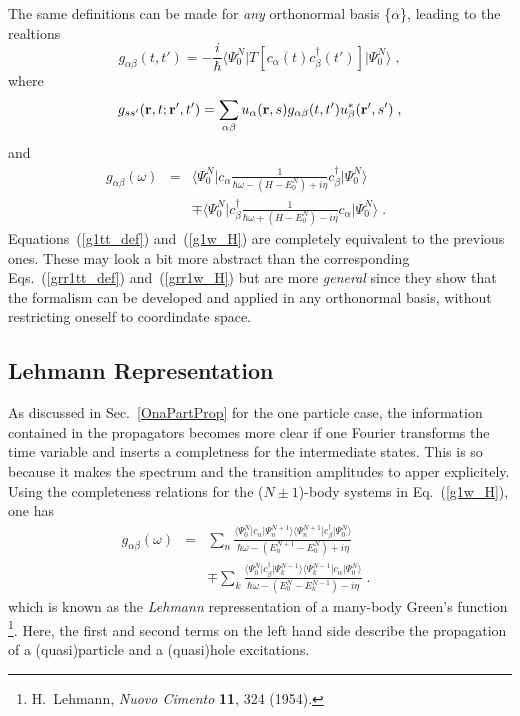 The same definitions can be made for {\em any} orthonormal basis \{$\alpha$\}, leading to the realtions
\begin{equation}
g_{\alpha \beta}(t, t') = -\frac{i}{\hbar} 
\langle \Psi^N_0 \vert T [c_\alpha(t) c_\beta^\dag(t')  ] \vert \Psi^N_0 \rangle \; ,
\label{g1tt_def}
\end{equation}
where
\begin{equation}
g_{s s'}({\bf r}, t; {\bf r}', t') = \sum_{\alpha \beta} u_\alpha({\bf r},s) g_{\alpha \beta}(t, t') u^*_\beta({\bf r}',s') \; ,
\label{grr1tt_vs_gab1tt}
\end{equation}
and 
\begin{eqnarray}
g_{\alpha \beta}(\omega) 
 &=& \langle \Psi^N_0 \vert c_\alpha \frac{1}{\hbar\omega - (H - E^N_0) + i\eta} c_\beta^\dag  \vert \Psi^N_0 \rangle 
\label{g1w_H} \\
 &&\mp \langle \Psi^N_0 \vert c_\beta^\dag \frac{1}{\hbar\omega + (H - E^N_0) - i\eta}  c_\alpha \vert \Psi^N_0 \rangle \; . \qquad 
\nonumber
\end{eqnarray}
Equations~(\ref{g1tt_def}) and~(\ref{g1w_H}) are completely equivalent to the previous ones. These may look a bit more abstract than the corresponding Eqs.~(\ref{grr1tt_def}) and~(\ref{grr1w_H}) but are more {\em general} since they show that the formalism can be developed and applied in any orthonormal basis, without restricting oneself to coordindate space.




\subsection{Lehmann Representation}

As discussed in Sec.~\ref{OnaPartProp} for the one particle case, the information contained in the propagators becomes more clear if one Fourier transforms the time variable and inserts a completness for the intermediate states. This is so because it makes the spectrum and the transition amplitudes to apper explicitely. Using the completeness relations for the ($N\pm1$)-body systems in Eq.~(\ref{g1w_H}), one has
\begin{eqnarray}
g_{\alpha \beta}(\omega) 
 &=& \sum_n \frac{ \langle \Psi^N_0 \vert c_\alpha  \vert  \Psi^{N+1}_n  \rangle \langle\Psi^{N+1}_n \vert  c_\beta^\dag  \vert \Psi^N_0 \rangle}
 {\hbar\omega - (E^{N+1}_n - E^N_0) + i\eta}
\label{g1w_Leh} \\
 &&\mp \sum_k \frac{ \langle \Psi^N_0 \vert c_\beta^\dag  \vert \Psi^{N-1}_k  \rangle \langle\Psi^{N-1}_k \vert  c_\alpha \vert \Psi^N_0 \rangle}
 {\hbar\omega - (E^N_0 - E^{N-1}_k) - i\eta}
  \; . \qquad 
\nonumber
\end{eqnarray}
which is known as the {\em Lehmann} repressentation of a many-body Green's function%
\footnote{\label{Leh.54} H.~Lehmann, {\em Nuovo Cimento} {\bf 11}, 324 (1954).}.
Here, the first and second terms on the left hand side describe the propagation of a (quasi)particle and a (quasi)hole excitations.

